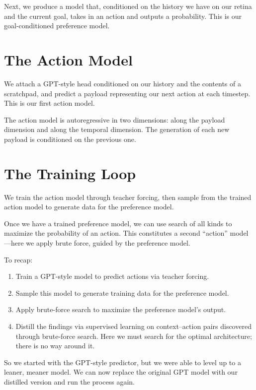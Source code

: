 \documentclass[12pt, a4paper]{article}
\begin{document}
Next, we produce a model that, conditioned on the history we have on our retina and the current goal, takes in an action and outputs a probability. This is our goal-conditioned preference model.

\section{The Action Model}

We attach a GPT-style head conditioned on our history and the contents of a scratchpad, and predict a payload representing our next action at each timestep. This is our first action model.

The action model is autoregressive in two dimensions: along the payload dimension and along the temporal dimension. The generation of each new payload is conditioned on the previous one.

\section{The Training Loop}

We train the action model through teacher forcing, then sample from the trained action model to generate data for the preference model.

Once we have a trained preference model, we can use search of all kinds to maximize the probability of an action. This constitutes a second ``action'' model---here we apply brute force, guided by the preference model.

To recap:

\begin{enumerate}
  \item Train a GPT-style model to predict actions via teacher forcing.
  \item Sample this model to generate training data for the preference model.
  \item Apply brute-force search to maximize the preference model's output.
  \item Distill the findings via supervised learning on context--action pairs discovered through brute-force search. Here we must search for the optimal architecture; there is no way around it.
\end{enumerate}

So we started with the GPT-style predictor, but we were able to level up to a leaner, meaner model. We can now replace the original GPT model with our distilled version and run the process again.
\end{document}
